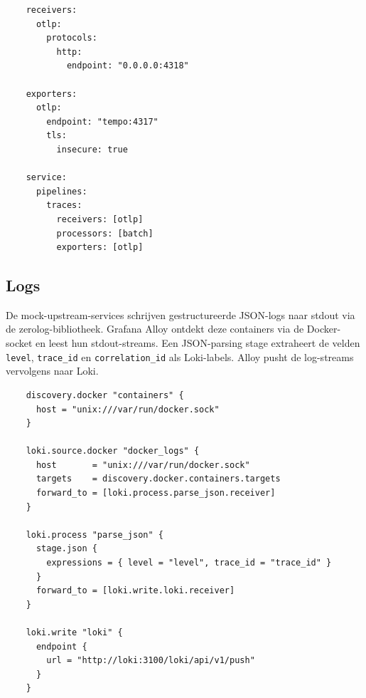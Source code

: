 \begin{listing}
  \begin{verbatim}
    receivers:
      otlp:
        protocols:
          http:
            endpoint: "0.0.0.0:4318"

    exporters:
      otlp:
        endpoint: "tempo:4317"
        tls:
          insecure: true

    service:
      pipelines:
        traces:
          receivers: [otlp]
          processors: [batch]
          exporters: [otlp]
  \end{verbatim}
  \caption[OTEL Collector: traces-pipeline configuratie.]{OTEL Collector configuratie voor de traces-pipeline: ontvangen van APISIX en doorsturen naar Tempo.}
  \label{lst:otel-traces-pipeline}
\end{listing}

\subsection{Logs}

De mock-upstream-services schrijven gestructureerde JSON-logs naar stdout via de zerolog-bibliotheek. Grafana Alloy ontdekt deze containers via de Docker-socket en leest hun stdout-streams. Een JSON-parsing stage extraheert de velden \texttt{level}, \texttt{trace\_id} en \texttt{correlation\_id} als Loki-labels. Alloy pusht de log-streams vervolgens naar Loki.

\begin{listing}
  \begin{verbatim}
    discovery.docker "containers" {
      host = "unix:///var/run/docker.sock"
    }

    loki.source.docker "docker_logs" {
      host       = "unix:///var/run/docker.sock"
      targets    = discovery.docker.containers.targets
      forward_to = [loki.process.parse_json.receiver]
    }

    loki.process "parse_json" {
      stage.json {
        expressions = { level = "level", trace_id = "trace_id" }
      }
      forward_to = [loki.write.loki.receiver]
    }

    loki.write "loki" {
      endpoint {
        url = "http://loki:3100/loki/api/v1/push"
      }
    }
  \end{verbatim}
  \caption[Grafana Alloy configuratie voor log-collectie.]{Vereenvoudigde Alloy-configuratie: Docker-discovery, JSON-parsing en doorsturen naar Loki.}
  \label{lst:alloy-config}
\end{listing}

